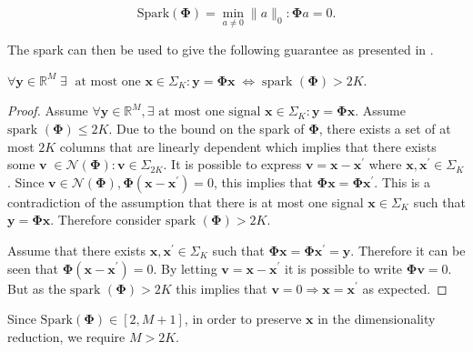 \begin{equation}
  \text{Spark}(\boldsymbol{\Phi}) = \min_{a \neq 0} \|a\|_0 : \boldsymbol{\Phi} a = 0. 
\label{eq:989}
\end{equation}

The spark can then be used to give the following guarantee as presented in \cite{eldar2012compressed}.

\begin{theorem}
  $\forall \boldsymbol{y}  \in \mathbb{R}^M \; \exists \; \text{ at most one } \boldsymbol{x} \in \Sigma_{K} : \boldsymbol{y} = \boldsymbol{\Phi}\boldsymbol{x} \; \iff \; \text{spark }(\boldsymbol{\Phi}) > 2K$.
\end{theorem}

\begin{proof}
  \label{sec:forall-boldsymb-in}
  Assume $\forall \boldsymbol{y} \in \mathbb{R}^M, \exists \text{ at most one signal } \boldsymbol{x} \in \Sigma_{K} : \boldsymbol{y} = \boldsymbol{\Phi}\boldsymbol{x}$. Assume $\text{spark }(\boldsymbol{\Phi}) \leq 2K$.  Due to the bound on the spark of $\boldsymbol{\Phi}$, there exists a set of at most $2K$ columns that are linearly dependent which implies that there exists some $\boldsymbol{v} \; \in \mathcal{N}(\boldsymbol{\Phi}) : \boldsymbol{v} \in \Sigma_{2K}.$  It is possible to express $\boldsymbol{v} = \boldsymbol{x} - \boldsymbol{x^{\prime}}$ where $\boldsymbol{x}, \boldsymbol{x^{\prime}} \in \Sigma_{K}$. Since $\boldsymbol{v} \in \mathcal{N}(\boldsymbol{\Phi}),  \boldsymbol{\Phi}(\boldsymbol{x} - \boldsymbol{x^{\prime}}) = 0$, this implies that  $\boldsymbol{\Phi x} = \boldsymbol{\Phi x^{\prime}}.$ This is a contradiction of the assumption that there is at most one signal $\boldsymbol{x} \in \Sigma_{K}$ such that $\boldsymbol{y} = \boldsymbol{\Phi}\boldsymbol{x}$. Therefore consider $\text{spark }(\boldsymbol{\Phi}) > 2K$. 

Assume that there exists $\boldsymbol{x}, \boldsymbol{x^{\prime}} \in \Sigma_{K}$ such that $\boldsymbol{\Phi x} = \boldsymbol{\Phi x^{\prime}} = \boldsymbol{y}.$ Therefore it can be seen that $\boldsymbol{\Phi}(\boldsymbol{x} - \boldsymbol{x^{\prime}}) = 0$. By letting $\boldsymbol{v} =  \boldsymbol{x} - \boldsymbol{x^{\prime}}$ it is possible to write $\boldsymbol{\Phi}\boldsymbol{v} = 0$. But as the $\text{spark }(\boldsymbol{\Phi}) > 2K$ this implies that $ \boldsymbol{v} = 0 \Rightarrow \boldsymbol{x} =  \boldsymbol{x^{\prime}}$ as expected.
\end{proof}

Since $\text{Spark}(\boldsymbol{\Phi}) \in [2,M+1]$, in order to preserve $\boldsymbol{x}$ in the dimensionality reduction, we require $M > 2K$. 
 
